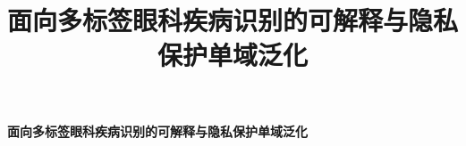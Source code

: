 \documentclass[a4paper,12pt]{article}
\title{面向多标签眼科疾病识别的可解释与隐私保护单域泛化}
\author{}
\date{}
\begin{document}
\begin{center}
{\bfseries 面向多标签眼科疾病识别的可解释与隐私保护单域泛化\par}
\end{center}
\vspace{-0.2em}
\thispagestyle{empty}






\FloatBarrier


\end{document}
